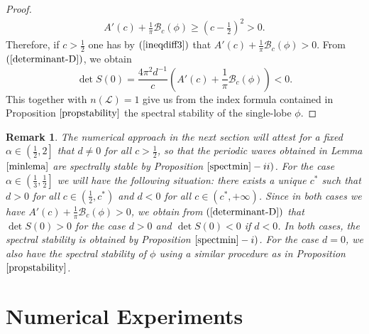 \documentclass[12pt,reqno]{amsart}
\newcommand{\2}{L^2_{per}(0, T)}
\numberwithin{equation}{section}
\numberwithin{figure}{section}
\newtheorem{remark}[theorem]{Remark}
\begin{document}
\begin{proof}
	\begin{equation}\label{ineqdiff3}\begin{array}{lllll}
\displaystyle	A'(c)+\frac{1}{\pi}\mathcal{B}_c(\phi)\geq \displaystyle \left(c-\frac{1}{2}\right)^2>0.
	\end{array}\end{equation}
	 Therefore, if $c>\frac{1}{2}$ one has by $(\ref{ineqdiff3})$ that $A'(c)+\frac{1}{\pi}\mathcal{B}_c(\phi)>0$. From $(\ref{determinant-D})$, we obtain $$\det S(0)=\frac{4\pi^2d^{-1}}{c} \left(A'(c)+ \frac{1}{\pi}\mathcal{B}_c(\phi) \right)<0.$$ This together with $n(\mathcal{L})=1$ give us from the index formula contained in Proposition $\ref{propstability}$ the spectral stability of the single-lobe $\phi$.
	
	
\end{proof}

\begin{remark}
	The numerical approach in the next section will attest for a fixed $\alpha\in\left(\frac{1}{2},2\right]$ that $d\neq0$ for all $c>\frac{1}{2}$, so that the periodic waves obtained in Lemma $\ref{minlema}$ are spectrally stable by Proposition $\ref{spectmin}-ii)$. For the case $\alpha\in\left(\frac{1}{3},\frac{1}{2}\right]$ we will have the following situation: there exists a unique $c^{*}$ such that $d>0$ for all $c\in\left(\frac{1}{2},c^{*}\right)$ and $d<0$ for all $c\in(c^*,+\infty)$. Since in both cases we have $A'(c)+\frac{1}{\pi}\mathcal{B}_c(\phi)>0$, we obtain from $(\ref{determinant-D})$ that $\det S(0)>0$ for the case $d>0$ and $\det S(0)<0$ if $d<0$. In both cases, the spectral stability is obtained by Proposition $\ref{spectmin}-i)$. For the case $d=0$, we also have the spectral stability of $\phi$ using a similar procedure as in Proposition $\ref{propstability}$.
\end{remark}

\section{Numerical Experiments}
\end{document}
